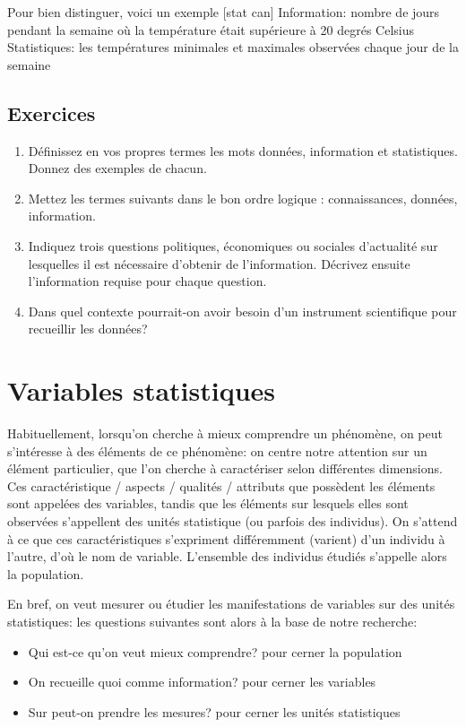 \documentclass[11pt,fleqn]{book} %
\begin{document}
Pour bien distinguer, voici un exemple [stat can]
Information: nombre de jours pendant la semaine où la température était supérieure à 20 degrés Celsius
Statistiques: les températures minimales et maximales observées chaque jour de la semaine

\subsection{Exercices}
\begin{enumerate}
	\item Définissez en vos propres termes les mots données, information et
    statistiques. Donnez des exemples de chacun.
	\item Mettez les termes suivants dans le bon ordre logique : connaissances,
    données, information.
	\item Indiquez trois questions politiques, économiques ou sociales
    d'actualité sur lesquelles il est nécessaire d'obtenir de l'information.
    Décrivez ensuite l'information requise pour chaque question.
    \item Dans quel contexte pourrait-on avoir  besoin d'un instrument
    scientifique pour recueillir les données? 
\end{enumerate}



\section{Variables statistiques}
Habituellement, lorsqu'on cherche à mieux comprendre un phénomène, on peut s'intéresse à des éléments de ce phénomène: on centre notre attention sur un élément particulier, que l'on cherche à caractériser selon différentes dimensions. Ces caractéristique / aspects / qualités / attributs que possèdent les éléments sont appelées des variables, tandis que les éléments sur lesquels elles sont observées s'appellent des unités statistique (ou parfois des individus). On s'attend à ce que ces caractéristiques s'expriment différemment (varient) d'un individu à l'autre, d'où le nom de variable. L'ensemble des individus étudiés s'appelle alors la population.

En bref, on veut mesurer ou étudier les manifestations de variables sur des unités statistiques: les questions suivantes sont alors à la base de notre recherche:
\begin{itemize}
  \item Qui est-ce qu'on veut mieux comprendre? pour cerner la population
  \item On recueille quoi comme information? pour cerner les variables
  \item Sur peut-on prendre les mesures? pour cerner les unités statistiques
\end{itemize}
\end{document}
